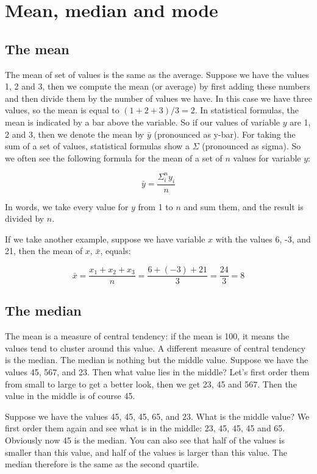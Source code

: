 \documentclass[]{report}\usepackage[]{graphicx}\usepackage[]{color}
\begin{document}
\section{Mean, median and mode}

\subsection{The mean}
The mean of set of values is the same as the average. Suppose we have the values 1, 2 and 3, then we compute the mean (or average) by first adding these numbers and then divide them by the number of values we have. In this case we have three values, so the mean is equal to $(1 + 2 + 3)/3 = 2$. In statistical formulas, the mean is indicated by a bar above the variable. So if our values of variable $y$ are 1, 2 and 3, then we denote the mean by $\bar{y}$ (pronounced as y-bar). For taking the sum of a set of values, statistical formulas show a $\Sigma$ (pronounced as sigma). So we often see the following formula for the mean of a set of $n$ values for variable $y$:

\begin{equation}
\bar{y} = \frac{\Sigma_i^n y_i}{n}
\end{equation}

In words, we take every value for $y$ from 1 to $n$ and sum them, and the result is divided by $n$. 

If we take another example, suppose we have variable $x$ with the values {6, -3, and 21}, then the mean of $x$, $\bar{x}$, equals:

\begin{equation}
\bar{x} = \frac{x_1 + x_2 + x_3}{n} = \frac{6 + (-3) + 21}{3} = \frac{24}{3} = 8
\end{equation}



\subsection{The median}
The mean is a measure of central tendency: if the mean is 100, it means the values tend to cluster around this value. A different measure of central tendency is the median. The median is nothing but the middle value. Suppose we have the values 45, 567, and 23. Then what value lies in the middle? Let's first order them from small to large to get a better look, then we get 23, 45 and 567. Then the value in the middle is of course 45. 

Suppose we have the values 45, 45, 45, 65, and 23. What is the middle value? We first order them again and see what is in the middle: 23, 45, 45, 45 and 65. Obviously now 45 is the median. You can also see that half of the values is smaller than this value, and half of the values is larger than this value. The median therefore is the same as the second quartile.
\end{document}
